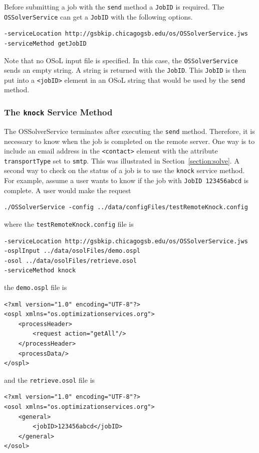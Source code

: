 \documentclass[11pt]{article}
\renewcommand{\_}{{\char"5F}}
\renewcommand{\{}{{\char"7B}}
\renewcommand{\}}{{\char"7D}}
\renewcommand{\^}{{\char"0D}}
\renewcommand{\'}{{\char"0D}}
\begin{document}
\begin{enumerate}[Step 1:]
Before  submitting a job with the {\tt send} method a {\tt JobID} 
is required. The {\tt OSSolverService} can get a {\tt JobID} with the following options.
\begin{verbatim}
-serviceLocation http://gsbkip.chicagogsb.edu/os/OSSolverService.jws
-serviceMethod getJobID
\end{verbatim}
Note that no OSoL input file is specified. In this case, the {\tt OSSolverService} sends an empty string. 
A string is returned with the {\tt JobID}. This {\tt JobID} is then put into a {\tt <jobID>} element in an 
OSoL string that would be used by the {\tt send} method.


\subsubsection{The  {\tt knock} Service Method}\label{section:knock}

The OSSolverService terminates after executing the {\tt send} method. Therefore, 
it is necessary to know when the job is completed on the remote server. One way is to include an email 
address in the  {\tt <contact>}  element with the attribute {\tt transportType} set to {\tt smtp}.  
This was illustrated in Section~\ref{section:solve}.  A second way to check on the status of a job is 
to use the {\tt knock} service method.  For example, assume a user   wants to know if  the job 
with {\tt JobID 123456abcd}  is complete. A user would make the request
\begin{verbatim}
./OSSolverService -config ../data/configFiles/testRemoteKnock.config
\end{verbatim}
where the {\tt testRemoteKnock.config} file is
\begin{verbatim}
-serviceLocation http://gsbkip.chicagogsb.edu/os/OSSolverService.jws
-osplInput ../data/osolFiles/demo.ospl
-osol ../data/osolFiles/retrieve.osol
-serviceMethod knock
\end{verbatim}
the {\tt demo.ospl} file is
\begin{verbatim}
<?xml version="1.0" encoding="UTF-8"?>
<ospl xmlns="os.optimizationservices.org">
    <processHeader>
        <request action="getAll"/>
    </processHeader>
    <processData/>
</ospl>
\end{verbatim}
and the {\tt retrieve.osol} file is
\begin{verbatim}
<?xml version="1.0" encoding="UTF-8"?>
<osol xmlns="os.optimizationservices.org">
    <general>
        <jobID>123456abcd</jobID>
    </general>
</osol>
\end{verbatim}


\end{enumerate}
\end{document}
